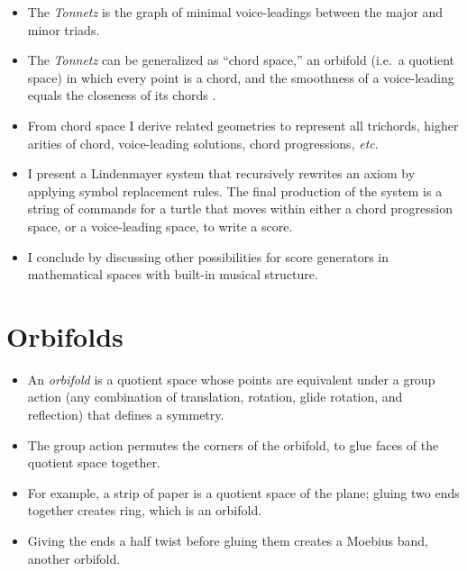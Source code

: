 \documentclass[14pt,letterpaper,onecolumn]{scrartcl}
\begin{document}
\begin{itemize}

\item The \emph{Tonnetz} is the graph of minimal voice-leadings between the major and minor triads. 

\item The \emph{Tonnetz} can be generalized as ``chord space,'' an orbifold (i.e.\ a quotient space) in which every point is a chord, and the smoothness of a voice-leading equals the closeness of its chords \cite{geometryofchords}. 

\item From chord space I derive related geometries to represent all trichords, higher arities of chord, voice-leading solutions, chord progressions, \emph{etc}. 

\item I present a Lindenmayer system that recursively rewrites an axiom by applying symbol replacement rules. The final production of the system is a string of commands for a turtle that moves within either a chord progression space, or a voice-leading space, to write a score.

\item I conclude by discussing other possibilities for score generators in mathematical spaces with built-in musical structure.

\end{itemize}

\section{Orbifolds}

\begin{itemize}

\item An \emph{orbifold} is a quotient space whose points are equivalent under a group action (any combination of translation, rotation, glide rotation, and reflection) that defines a symmetry. 

\item The group action permutes the corners of the orbifold, to glue faces of the quotient space together. 

\item For example, a strip of paper is a quotient space of the plane; gluing two ends together creates ring, which is an orbifold. 

\item Giving the ends a half twist before gluing them creates a Moebius band, another orbifold.

\end{itemize}
\end{document}
